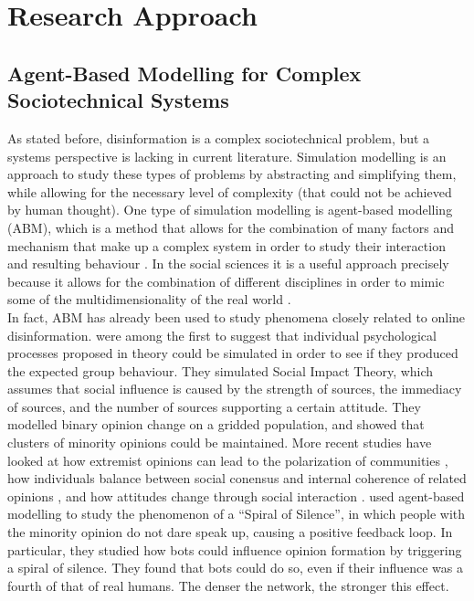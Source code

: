 \section{Research Approach}

 \subsection{Agent-Based Modelling for Complex Sociotechnical Systems}
 As stated before, disinformation is a complex sociotechnical problem, but a systems perspective is lacking in current literature. Simulation modelling is an approach to study these types of problems by abstracting and simplifying them, while allowing for the necessary level of complexity (that could not be achieved by human thought). One type of simulation modelling is agent-based modelling (ABM), which is a method that allows for the combination of many factors and mechanism that make up a complex system in order to study their interaction and resulting behaviour \citep{Flache2017}.  In the social sciences it is a useful approach precisely because it allows for the combination of different disciplines in order to mimic some of the multidimensionality of the real world \citep{Epstein2006}. \\
 
 In fact, ABM has already been used to study phenomena closely related to online disinformation. \cite{Nowak1990} were among the first to suggest that individual psychological processes proposed in theory could be simulated in order to see if they produced the expected group behaviour. They simulated Social Impact Theory, which assumes that social influence is caused by the strength of sources, the immediacy of sources, and the number of sources supporting a certain attitude. They modelled binary opinion change on a gridded population, and showed that clusters of minority opinions could be maintained. More recent studies have looked at how extremist opinions can lead to the polarization of communities \citep{Deffuant2002}, how individuals balance between social conensus and internal coherence of related opinions \citep{Battiston2016a}, and how attitudes change through social interaction \citep{ChattoeBrown2014}. \cite{Ross2019} used agent-based modelling to study the phenomenon of a “Spiral of Silence”, in which people with the minority opinion do not dare speak up, causing a positive feedback loop. In particular, they studied how bots could influence opinion formation by triggering a spiral of silence. They found that bots could do so, even if their influence was a fourth of that of real humans. The denser the network, the stronger this effect. \\ 
 

